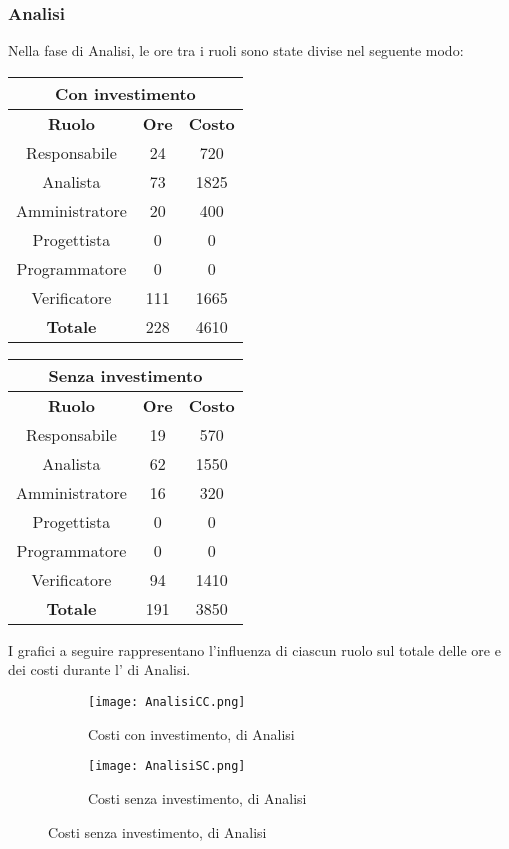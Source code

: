 \documentclass{scalatekids-article}
\begin{document}
\subsubsection{Analisi}
Nella fase di Analisi, le ore tra i ruoli sono state divise nel seguente modo:
\begin{center}
  \normalsize
  \begin{tabular}{| c | c | c |}
    \hline
    \multicolumn{3}{|c|}{\textbf{Con investimento}}\\
    \hline
    \textbf{Ruolo} & \textbf{Ore} & \textbf{Costo}\\
    \hline
    Responsabile & 24 & 720\\
    Analista & 73 & 1825\\
    Amministratore & 20 & 400\\
    Progettista & 0 & 0\\
    Programmatore & 0 & 0\\
    Verificatore & 111 & 1665 \\
    \hline
    \textbf{Totale} & 228 & 4610\\
    \hline
  \end{tabular}
  \qquad
  \begin{tabular}{| c | c | c |}
    \hline
    \multicolumn{3}{|c|}{\textbf{Senza investimento}}\\
    \hline
    \textbf{Ruolo} & \textbf{Ore} & \textbf{Costo}\\
    \hline
    Responsabile & 19 & 570\\
    Analista & 62 & 1550\\
    Amministratore & 16 & 320\\
    Progettista & 0 & 0\\
    Programmatore & 0 & 0\\
    Verificatore & 94 & 1410 \\
    \hline
    \textbf{Totale} & 191 & 3850\\
    \hline
  \end{tabular}
\end{center}
I grafici a seguire rappresentano l'influenza di ciascun ruolo sul totale delle ore e dei costi durante l' di Analisi.
\begin{figure}[H]
  \begin{subfigure}[H]{0.47\textwidth}
    \texttt{[image: AnalisiCC.png]}
    \caption*{Costi con investimento,  di Analisi}
  \end{subfigure}
  \qquad
  \begin{subfigure}[H]{0.47\textwidth}
    \texttt{[image: AnalisiSC.png]}
    \caption*{Costi senza investimento,  di Analisi}
  \end{subfigure}
\end{figure}
\newpage
\end{document}
